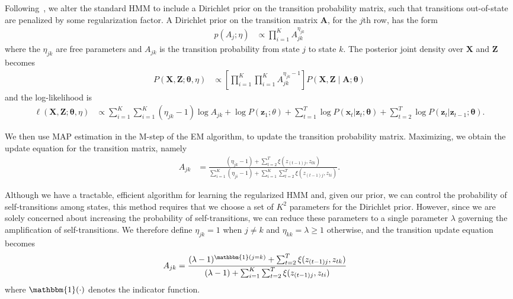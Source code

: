 \documentclass[12pt]{article}
\begin{document}
Following~\cite{MAP1994}, we alter the standard HMM to include a Dirichlet prior on the transition probability matrix, such that transitions out-of-state are penalized by some regularization factor. A Dirichlet prior on the transition matrix $\mathbf{A}$, for the $j$th row, has the form
\begin{align*}
    p(A_j; \eta) &\propto \prod_{i=1}^{K} A_{jk}^{\eta_{jk}}
\end{align*}
where the $\eta_{jk}$ are free parameters and $A_{jk}$ is the transition probability from state $j$ to state $k$. The posterior joint density over $\mathbf{X}$ and $\mathbf{Z}$ becomes
\begin{align*}
    P(\mathbf{X}, \mathbf{Z} ; \mathbf{\theta}, \eta) 
    &\propto \left[\prod_{i=1}^{K}\prod_{i=1}^{K} A_{jk}^{\eta_{jk} - 1}\right] P(\mathbf{X}, \mathbf{Z} \mid \mathbf{A}; \mathbf{\theta}) 
\end{align*}
and the log-likelihood is
\begin{align*}
\ell(\mathbf{X}, \mathbf{Z} ; \mathbf{\theta}, \eta) 
&\propto \sum_{i=1}^{K}\sum_{i=1}^{K} (\eta_{jk} - 1)\log A_{jk} + \log P(\mathbf{z}_{1}; \theta) + \sum_{t=1}^{T}\log P(\mathbf{x}_t|\mathbf{z}_t; \mathbf{\theta}) + \sum_{t=2}^{T}\log P(\mathbf{z}_t|\mathbf{z}_{t-1}; \mathbf{\theta}).
\end{align*}

We then use MAP estimation in the M-step of the EM algorithm, to update the transition probability matrix. Maximizing, we obtain the update equation for the transition matrix, namely
\begin{align*}
    A_{jk} &= \frac{(\eta_{jk} - 1) + \sum_{t=2}^{T} \xi(z_{(t-1)j}, z_{tk})}   
    {\sum_{i=1}^{K}(\eta_{ji} - 1) + \sum_{i=1}^{K}\sum_{t=2}^{T} \xi(z_{(t-1)j}, z_{ti})}.
\end{align*}

Although we have a tractable, efficient algorithm for learning the regularized HMM and, given our prior, we can control the probability of self-transitions among states, this method requires that we choose a set of $K^2$ parameters for the Dirichlet prior. However, since we are solely concerned about increasing the probability of self-transitions, we can reduce these parameters to a single parameter $\lambda$ governing the amplification of self-transitions. We therefore define $\eta_{jk} = 1$ when $j\not=k$ and $\eta_{kk}= \lambda \geq 1$ otherwise, and the transition update equation becomes
\begin{align*}
    A_{jk} &= \frac{(\lambda - 1)^{\mathbbm{1}(j = k)} + \sum_{t=2}^{T} \xi(z_{(t-1)j}, z_{tk})}   
    {(\lambda - 1) + \sum_{i=1}^{K}\sum_{t=2}^{T} \xi(z_{(t-1)j}, z_{ti})}
\end{align*}
where $\mathbbm{1}(\cdot)$ denotes the indicator function.
\end{document}
